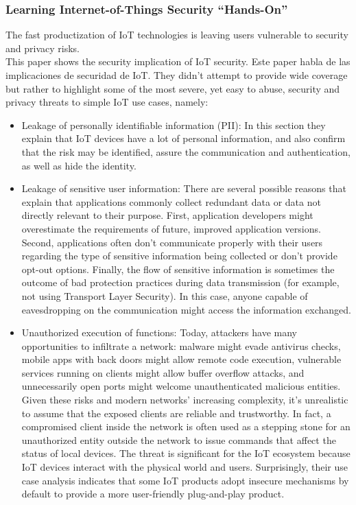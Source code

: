 \subsubsection{Learning Internet-of-Things Security ``Hands-On''}\cite{Paper10}
The fast productization of IoT technologies is leaving users vulnerable to security and privacy risks.\\
This paper shows the security implication of IoT security.
Este paper habla de las implicaciones de securidad de IoT. They didn't attempt to provide wide coverage but rather to highlight some of the most severe, yet easy to abuse, security and privacy threats to simple IoT use cases, namely:
\begin{itemize}
	\item Leakage of personally identifiable information (PII): In this section they explain that IoT devices have a lot of personal information, and also confirm that the risk may be identified, assure the communication and authentication, as well as hide the identity.
	
	\item Leakage of sensitive user information: There are several possible reasons that explain that applications commonly collect redundant data or data not directly relevant to their purpose. First, application developers might overestimate the requirements of future, improved application versions. Second, applications often don't communicate properly with their users regarding the type of sensitive information being collected or don't provide opt-out options. Finally, the flow of sensitive information is sometimes the outcome of bad protection practices during data transmission (for example, not using Transport Layer Security). In this case, anyone capable of eavesdropping on the communication might access the information exchanged.
	
	\item Unauthorized execution of functions: Today, attackers have many opportunities to infiltrate a network: malware might evade antivirus checks, mobile apps with back doors might allow remote code execution, vulnerable services running on clients might allow buffer overflow attacks, and unnecessarily open ports might welcome unauthenticated malicious entities. Given these risks and modern networks' increasing complexity, it's unrealistic to assume that the exposed clients are reliable and trustworthy. In fact, a compromised client inside the network is often used as a stepping stone for an unauthorized entity outside the network to issue commands that affect the status of local devices. The threat is significant for the IoT ecosystem because IoT devices interact with the physical world and users. Surprisingly, their use case analysis indicates that some IoT products adopt insecure mechanisms by default to provide a more user-friendly plug-and-play product.
\end{itemize}

